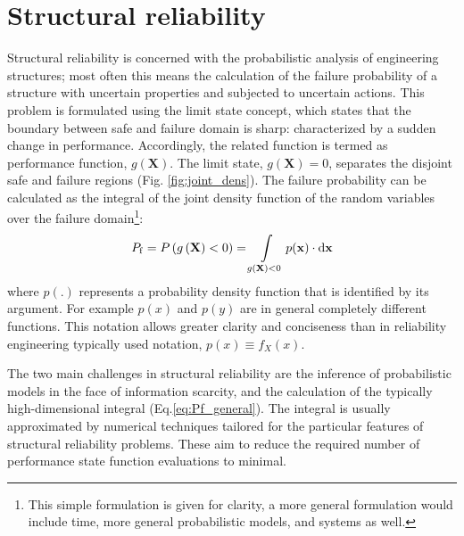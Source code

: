 
\section{Structural reliability}
Structural reliability is concerned with the probabilistic analysis of engineering structures; most often this means the calculation of the failure probability of a structure with uncertain properties and subjected to uncertain actions. This problem is formulated using the limit state concept, which states that the boundary between safe and failure domain is sharp: characterized by a sudden change in performance. Accordingly, the related function is termed as performance function, $g(\mathbf{X})$. The limit state, $g(\mathbf{X})=0$, separates the disjoint safe and failure regions (Fig. \ref{fig:joint_dens}). The failure probability can be calculated as the integral of the joint density function of the random variables over the failure domain\footnote{This simple formulation is given for clarity, a more general formulation would include time, more general probabilistic models, and systems as well.}:
\begin{equation}
	\label{eq:Pf_general}
	 {P_{\mathrm{f}}} = P\left( {g\left( {\bf{X}} \right) < 0} \right) = \int\limits_{g\left( {\bf{X}} \right) < 0} {p({\bf{x}}) \cdot \mathrm{d}{\bf{x}}}
\end{equation}
where $p(.)$ represents a probability density function that is identified by its argument. For example $p(x)$ and $p(y)$ are in general completely different functions. This notation allows greater clarity and conciseness than in reliability engineering typically used notation, $p(x) \equiv f_X(x)$.

The two main challenges in structural reliability are the inference of probabilistic models in the face of information scarcity, and the calculation of the typically high-dimensional integral (Eq.\ref{eq:Pf_general}). The integral is usually approximated by numerical techniques tailored for the particular features of structural reliability problems. These aim to reduce the required number of performance state function evaluations to minimal.

